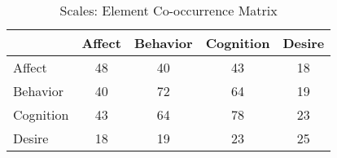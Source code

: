 \begin{table}

\caption{\label{tab:ScaleElementCooccurrences}Scales: Element Co-occurrence Matrix}
\centering
\begin{tabular}[t]{lcccc}
\toprule
  & Affect & Behavior & Cognition & Desire\\
\midrule
Affect & 48 & 40 & 43 & 18\\
Behavior & 40 & 72 & 64 & 19\\
Cognition & 43 & 64 & 78 & 23\\
Desire & 18 & 19 & 23 & 25\\
\bottomrule
\end{tabular}
\end{table}
